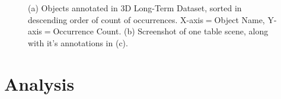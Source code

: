 \documentclass[letterpaper, 10 pt, conference]{ieeeconf}  %
\begin{document}
\begin{figure}[t]
\begin{center}
\\
\\
\caption{(a) Objects annotated in 3D Long-Term Dataset, sorted in descending order of count of occurrences. X-axis$=$Object Name, Y-axis$=$Occurrence Count. (b) Screenshot of one table scene, along with it's annotations in (c).}
\end{center}
\end{figure}



\section{Analysis}
\label{sec:Analysis}
\end{document}
